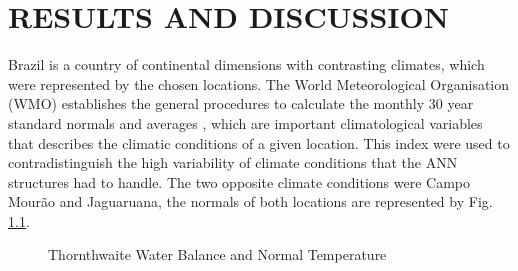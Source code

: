 \chapter{RESULTS AND DISCUSSION }
\label{chapter:servidores_linux}
\vspace{-2cm}


Brazil is a country of continental dimensions with contrasting climates, which were represented by the chosen locations. The World Meteorological Organisation (WMO) establishes the general procedures to calculate the monthly 30 year standard normals and averages \cite{wmo1989calculation}, which are important climatological variables that describes the climatic conditions of a given location. This index were used to contradistinguish the high variability of climate conditions that the ANN structures had to handle. The two opposite climate conditions were Campo Mourão and Jaguaruana, the normals of both locations are represented by Fig. \ref{img:figure4}.


\begin{figure}[htbp]
\caption{Thornthwaite Water Balance and Normal Temperature}
\label{img:figure4}
\end{figure}


